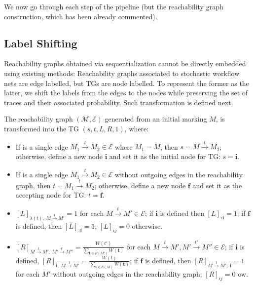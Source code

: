 We now go through each step of the pipeline (but the reachability graph construction, which has been already commented).


\subsection{Label Shifting}\label{sec:LSift}
Reachability graphs obtained via sequentialization cannot be directly embedded using existing methods:  Reachability graphs 
associated to stochastic workflow nets are edge labelled, but TGs are node labelled. To represent the former as the latter, we 
shift the labels from the edges to the nodes  while preserving the set of traces and their associated probability. 
Such transformation is defined next.

\begin{definition}\label{def:transf}
The reachability graph $(\mathcal{M},\mathcal{E})$ generated from an initial marking $M$, is transformed into the TG $(s,t,L,R,1)$, where:
\begin{itemize}
	\item If is a single edge $M_1\overset{t}{\to}M_2\in\mathcal{E}$ where $M_1=M$, then $s=M\overset{t}{\to}M_2$; otherwise, define a new node $\textbf{i}$ and set it as the initial node for TG: $s=\textbf{i}$.
	\item If is a single edge $M_1\overset{t}{\to}M_2\in\mathcal{E}$ without outgoing edges in the reachability graph, then $t=M_1\overset{t}{\to}M_2$; otherwise, define a new node $\textbf{f}$ and set it as the accepting node for TG:  $t=\textbf{f}$.
	\item $[L]_{\lambda(t),\;M\overset{t}{\to} M'}=1$ for each $M\overset{t}{\to} M'\in\mathcal{E}$; if $\textbf{i}$ is defined then $[L]_{\tau\textbf{i}}=1$; if $\textbf{f}$ is defined, then $[L]_{\tau\textbf{f}}=1$; $[L]_{ij}=0$ otherwise.
	\item $[R]_{M\overset{t}{\to} M',\;M'\overset{t'}{\to} M''}=\frac{W(t')}{\sum_{\textbf{t}\in E(M')}W(\textbf{t})}$ for each $M\overset{t}{\to} M',M'\overset{t'}{\to} M''\in\mathcal{E}$; if $\textbf{i}$ is defined, $[R]_{\textbf{i},\;M\overset{t}{\to}M'}=\frac{W(t)}{\sum_{\textbf{t}\in E(M)}W(\textbf{t})}$; if $\textbf{f}$ is defined, then $[R]_{M\overset{t}{\to}M',\;\textbf{i}}=1$ for each $M'$ without outgoing edges in the reachability graph; $[R]_{ij}=0$ ow.
\end{itemize}
\end{definition}

\endinput
%
We can show that the TG obtained in Definition \ref{def:transf} preserves the same set of probabilistic traces associated by the reachability graph. The proof is omitted due to the lack of space.

